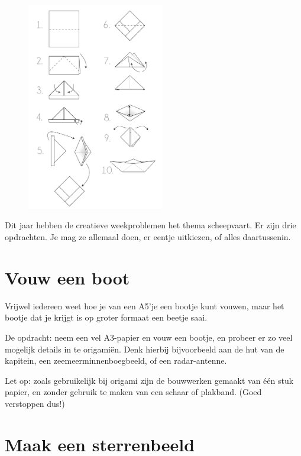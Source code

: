 \documentclass{weekprobleem}
\begin{document}

\begin{figure}
	\vspace{-6mm}
	\includegraphics[width=6cm]{origami-boot}
	\vspace{-0mm}
\end{figure}

Dit jaar hebben de creatieve weekproblemen het thema scheepvaart.
Er zijn drie opdrachten. Je mag ze allemaal doen, er eentje uitkiezen, of alles daartussenin.

\section*{Vouw een boot}

Vrijwel iedereen weet hoe je van een A5'je een bootje kunt vouwen, maar het bootje dat je krijgt is op groter formaat een beetje saai.

De opdracht: neem een vel A3-papier en vouw een bootje, en probeer er zo veel mogelijk details in te origamiën.
Denk hierbij bijvoorbeeld aan de hut van de kapitein, een zeemeerminnenboegbeeld, of een radar-antenne.

Let op: zoals gebruikelijk bij origami zijn de bouwwerken gemaakt van één stuk papier, en zonder gebruik te maken van een schaar of plakband.
{\tiny (Goed verstoppen dus!)}


\section*{Maak een sterrenbeeld}
\end{document}
